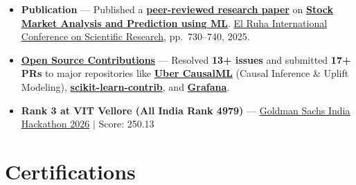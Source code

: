 \documentclass[a4paper,10pt]{article}
\newcommand{\ulink}[2]{\href{#1}{#2}}
\begin{document}
\begin{itemize}[nosep, leftmargin=1.5em, itemsep=2pt, topsep=2pt]
  \item {\color[HTML]{0A0A0A}\fontsize{11}{14}\selectfont \textbf{Publication} --- Published a \ulink{https://www.elruha.org/_files/ugd/614b1f_6b95e1b697bf452b9907ba46e0151c05.pdf\#page=774}{\textbf{peer-reviewed research paper}} on \ulink{https://github.com/su-jin1425/Set-Project}{\textbf{Stock Market Analysis and Prediction using ML}}. \ulink{https://www.elruha.org/congress-books}{El Ruha International Conference on Scientific Research}, pp.\ 730--740, 2025.}
  \item {\color[HTML]{0A0A0A}\fontsize{11}{14}\selectfont \textbf{\ulink{https://github.com/su-jin1425/My-Open-Source-Contributions}{Open Source Contributions}} --- Resolved \textbf{13+ issues} and submitted \textbf{17+ PRs} to major repositories like \ulink{https://github.com/uber/causalml}{\textbf{Uber CausalML}} (Causal Inference \& Uplift Modeling), \ulink{https://github.com/scikit-learn-contrib/forest-confidence-interval}{\textbf{scikit-learn-contrib}}, and \ulink{https://github.com/grafana/alloy-scenarios}{\textbf{Grafana}}.}
  \item {\color[HTML]{0A0A0A}\fontsize{11}{14}\selectfont \textbf{Rank 3 at VIT Vellore (All India Rank 4979)} --- \ulink{https://www.hackerrank.com/contests/goldman-sachs-india-hackathon-2026-cs/leaderboard}{Goldman Sachs India Hackathon 2026} $|$ Score: 250.13}
\end{itemize}

\section{Certifications}
\vspace{2pt}
\end{document}
